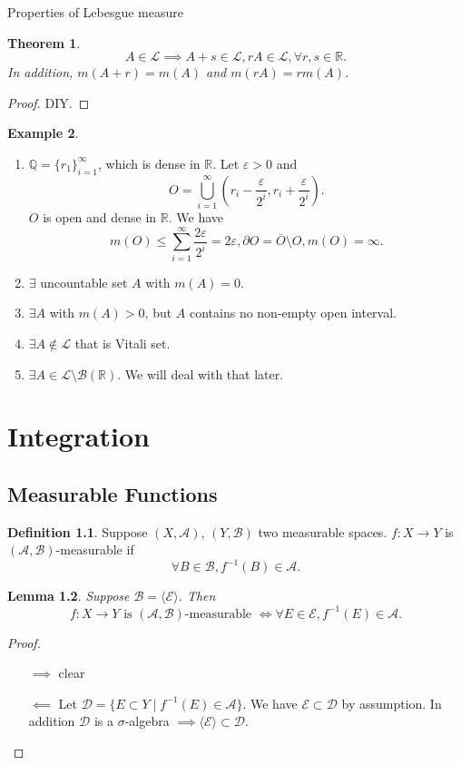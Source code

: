 \documentclass{report}
\newcommand{\R}{\mathbb{R}}
\newcommand{\Q}{\mathbb{Q}}
\newtheorem{theorem}{Theorem}[chapter]
\newtheorem{lemma}[theorem]{Lemma}
\theoremstyle{definition}
\newtheorem{definition}[theorem]{Definition}
\newtheorem{example}[theorem]{Example}
\theoremstyle{remark}
\newcommand{\fnl}{\parbox[t]{0\linewidth}{}}
\begin{document}
Properties of Lebesgue measure
\begin{theorem}
	\[A \in \mathcal{L} \implies A + s \in \mathcal{L}, rA \in \mathcal{L}, \forall r, s \in \R.\]
	In addition, $m(A + r) = m(A)$ and $m(rA) = rm(A)$.
\end{theorem}
\begin{proof}
	DIY.
\end{proof}

\begin{example}\fnl
	\begin{enumerate}
		\item $\Q = \{r_1\}_{i=1}^\infty$, which is dense in $\R$.
		Let $\varepsilon > 0$ and \[
			O = \bigcup_{i=1}^\infty\left(r_i - \frac{\varepsilon}{2^i}, r_i + \frac{\varepsilon}{2^i}\right).
		\] $O$ is open and dense in $\R$.
		We have
		\[
			m(O) \leq \sum_{i=1}^\infty \frac{2\varepsilon}{2^i} = 2\varepsilon, \partial O = \overline{O} \setminus O, m(O) = \infty.
		\]

		\item $\exists$ uncountable set $A$ with $m(A) = 0$.
		\item $\exists A$ with $m(A) > 0$, but $A$ contains no non-empty open interval.
		\item $\exists A \notin \mathcal{L}$ that is Vitali set.
		\item $\exists A \in \mathcal{L} \setminus \mathcal{B}(\R)$. We will deal with that later.
	\end{enumerate}
\end{example}

\chapter{Integration}
\section{Measurable Functions}
\begin{definition}
	Suppose $(X, \mathcal{A})$, $(Y, \mathcal{B})$ two measurable spaces. 
	$f: X \to Y$ is $(\mathcal{A}, \mathcal{B})$-measurable if 
	\[\forall B \in \mathcal{B}, f^{-1}(B) \in \mathcal{A}.\] 
\end{definition}

\begin{lemma}\label{le:clever}
	Suppose $\mathcal{B} = \langle\mathcal{E}\rangle$. Then \[f: X \to Y \text{ is }(\mathcal{A}, \mathcal{B}) \text{-measurable } \iff \forall E \in \mathcal{E}, f^{-1}(E) \in \mathcal{A}.\]
\end{lemma}
\begin{proof}
	\begin{itemize}
		\item [$\implies$] clear
		\item [$\impliedby$] Let $\mathcal{D} = \{E \subset Y \mid f^{-1}(E) \in \mathcal{A}\}$. We have $\mathcal{E} \subset \mathcal{D}$ by assumption. In addition $\mathcal{D}$ is a $\sigma$-algebra $\implies \langle\mathcal{E}\rangle \subset \mathcal{D}$.\qedhere
	\end{itemize} 
\end{proof}
\end{document}
